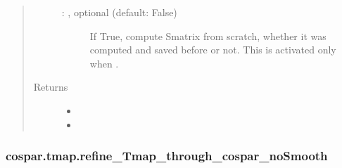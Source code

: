 \documentclass[letterpaper,10pt,english]{sphinxmanual}
\begin{document}
\begin{fulllineitems}
\begin{quote}
\begin{description}
\begin{description}
\item[{ : , optional (default: False)}] \leavevmode
If True, compute Smatrix from scratch, whether it was
computed and saved before or not. This is activated only when
.

\end{description}

\item[{Returns}] \leavevmode
\begin{itemize}
\item {} 

\item {} 

\end{itemize}


\end{description}\end{quote}

\end{fulllineitems}



\subsubsection{cospar.tmap.refine\_Tmap\_through\_cospar\_noSmooth}
\label{\detokenize{cospar.tmap.refine_Tmap_through_cospar_noSmooth:cospar-tmap-refine-tmap-through-cospar-nosmooth}}\label{\detokenize{cospar.tmap.refine_Tmap_through_cospar_noSmooth::doc}}
\end{document}
